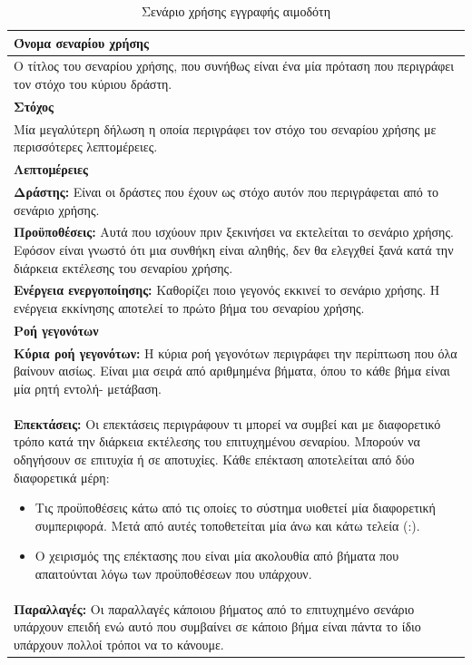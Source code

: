  
\begin{table}[H]
	\begin{center}
	    \begin{tabular}{|p{\dimexpr \linewidth-2\tabcolsep}|}
	    \hline
	    \rowcolor{grayy}
	    \textbf{Όνομα σεναρίου χρήσης}
	    \\ \hline    
	    Ο τίτλος του σεναρίου χρήσης, που συνήθως είναι ένα μία πρόταση που περιγράφει τον στόχο του κύριου δράστη.
	    \\ \hline
	    \rowcolor{grayy}
	    \textbf{Στόχος}
	    \\ \hline
 Μία μεγαλύτερη δήλωση η οποία περιγράφει τον στόχο του σεναρίου χρήσης με περισσότερες λεπτομέρειες.
	    \\ \hline
	    \rowcolor{grayy}
	    \textbf{Λεπτομέρειες}
	    \\ \hline
		\textbf{Δράστης:} Είναι οι δράστες που έχουν ως στόχο αυτόν που περιγράφεται από το σενάριο χρήσης.
		\\ \hline
		\textbf{Προϋποθέσεις:} Αυτά που ισχύουν πριν ξεκινήσει να εκτελείται το σενάριο χρήσης. Εφόσον είναι γνωστό ότι μια συνθήκη είναι αληθής, δεν θα ελεγχθεί ξανά κατά την διάρκεια εκτέλεσης του σεναρίου χρήσης. 
		\\ \hline
		\textbf{Ενέργεια ενεργοποίησης:} Καθορίζει ποιο γεγονός εκκινεί το σενάριο χρήσης. Η ενέργεια εκκίνησης αποτελεί το πρώτο βήμα του σεναρίου χρήσης. 
		\\ \hline
		\rowcolor{grayy}    
	    \textbf{Ροή γεγονότων}
	    \\ \hline
		\textbf{Κύρια ροή γεγονότων:}
		Η κύρια ροή γεγονότων περιγράφει την περίπτωση που όλα βαίνουν αισίως. Είναι μια σειρά από αριθμημένα βήματα, όπου το κάθε βήμα είναι μία ρητή εντολή- μετάβαση.
		\\ \hline
		\textbf{Επεκτάσεις:} 
Οι επεκτάσεις περιγράφουν τι μπορεί να συμβεί και με διαφορετικό τρόπο κατά την διάρκεια εκτέλεσης του επιτυχημένου σεναρίου. Μπορούν να οδηγήσουν σε επιτυχία ή σε αποτυχίες. Κάθε επέκταση αποτελείται από δύο διαφορετικά μέρη:
 \begin{itemize}
 \item Τις προϋποθέσεις κάτω από τις οποίες το σύστημα υιοθετεί μία διαφορετική συμπεριφορά. Μετά από αυτές τοποθετείται μία άνω και κάτω τελεία (:).
 \item Ο χειρισμός της επέκτασης που είναι μία ακολουθία από βήματα που απαιτούνται λόγω των προϋποθέσεων που υπάρχουν.
 \end{itemize}
		\\ \hline
		\textbf{Παραλλαγές:}
		 Οι παραλλαγές κάποιου βήματος από το επιτυχημένο σενάριο υπάρχουν επειδή ενώ αυτό που συμβαίνει σε κάποιο βήμα είναι πάντα το ίδιο υπάρχουν πολλοί τρόποι να το κάνουμε.
		 \\ \hline

	    \end{tabular}
	    \caption{Σενάριο χρήσης εγγραφής αιμοδότη}
		\label{tab:use_case_sample_table}
	\end{center}
\end{table}
 

